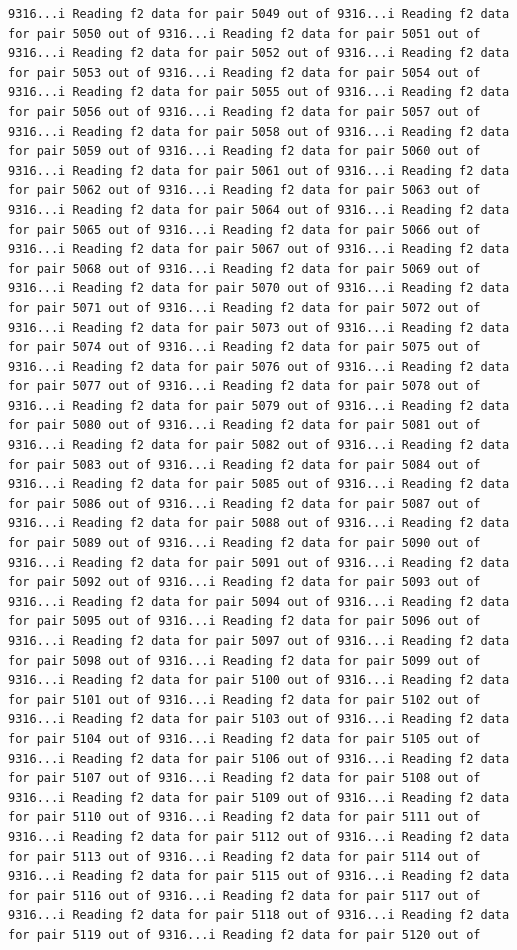 \documentclass[
]{article}
\begin{document}
\begin{verbatim}
9316...i Reading f2 data for pair 5049 out of 9316...i Reading f2 data for pair 5050 out of 9316...i Reading f2 data for pair 5051 out of 9316...i Reading f2 data for pair 5052 out of 9316...i Reading f2 data for pair 5053 out of 9316...i Reading f2 data for pair 5054 out of 9316...i Reading f2 data for pair 5055 out of 9316...i Reading f2 data for pair 5056 out of 9316...i Reading f2 data for pair 5057 out of 9316...i Reading f2 data for pair 5058 out of 9316...i Reading f2 data for pair 5059 out of 9316...i Reading f2 data for pair 5060 out of 9316...i Reading f2 data for pair 5061 out of 9316...i Reading f2 data for pair 5062 out of 9316...i Reading f2 data for pair 5063 out of 9316...i Reading f2 data for pair 5064 out of 9316...i Reading f2 data for pair 5065 out of 9316...i Reading f2 data for pair 5066 out of 9316...i Reading f2 data for pair 5067 out of 9316...i Reading f2 data for pair 5068 out of 9316...i Reading f2 data for pair 5069 out of 9316...i Reading f2 data for pair 5070 out of 9316...i Reading f2 data for pair 5071 out of 9316...i Reading f2 data for pair 5072 out of 9316...i Reading f2 data for pair 5073 out of 9316...i Reading f2 data for pair 5074 out of 9316...i Reading f2 data for pair 5075 out of 9316...i Reading f2 data for pair 5076 out of 9316...i Reading f2 data for pair 5077 out of 9316...i Reading f2 data for pair 5078 out of 9316...i Reading f2 data for pair 5079 out of 9316...i Reading f2 data for pair 5080 out of 9316...i Reading f2 data for pair 5081 out of 9316...i Reading f2 data for pair 5082 out of 9316...i Reading f2 data for pair 5083 out of 9316...i Reading f2 data for pair 5084 out of 9316...i Reading f2 data for pair 5085 out of 9316...i Reading f2 data for pair 5086 out of 9316...i Reading f2 data for pair 5087 out of 9316...i Reading f2 data for pair 5088 out of 9316...i Reading f2 data for pair 5089 out of 9316...i Reading f2 data for pair 5090 out of 9316...i Reading f2 data for pair 5091 out of 9316...i Reading f2 data for pair 5092 out of 9316...i Reading f2 data for pair 5093 out of 9316...i Reading f2 data for pair 5094 out of 9316...i Reading f2 data for pair 5095 out of 9316...i Reading f2 data for pair 5096 out of 9316...i Reading f2 data for pair 5097 out of 9316...i Reading f2 data for pair 5098 out of 9316...i Reading f2 data for pair 5099 out of 9316...i Reading f2 data for pair 5100 out of 9316...i Reading f2 data for pair 5101 out of 9316...i Reading f2 data for pair 5102 out of 9316...i Reading f2 data for pair 5103 out of 9316...i Reading f2 data for pair 5104 out of 9316...i Reading f2 data for pair 5105 out of 9316...i Reading f2 data for pair 5106 out of 9316...i Reading f2 data for pair 5107 out of 9316...i Reading f2 data for pair 5108 out of 9316...i Reading f2 data for pair 5109 out of 9316...i Reading f2 data for pair 5110 out of 9316...i Reading f2 data for pair 5111 out of 9316...i Reading f2 data for pair 5112 out of 9316...i Reading f2 data for pair 5113 out of 9316...i Reading f2 data for pair 5114 out of 9316...i Reading f2 data for pair 5115 out of 9316...i Reading f2 data for pair 5116 out of 9316...i Reading f2 data for pair 5117 out of 9316...i Reading f2 data for pair 5118 out of 9316...i Reading f2 data for pair 5119 out of 9316...i Reading f2 data for pair 5120 out of 
\end{verbatim}
\end{document}
